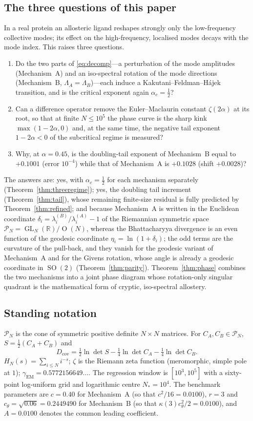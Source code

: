 \documentclass[11pt,reqno]{amsart}
\theoremstyle{plain}
\theoremstyle{definition}
\theoremstyle{remark}
\numberwithin{equation}{section}
\DeclareMathOperator{\GL}{GL}
\DeclareMathOperator{\Or}{O}
\DeclareMathOperator{\SO}{SO}
\newcommand{\Dcov}{D_{\mathrm{cov}}}
\newcommand{\Rr}{\mathbb{R}}
\newcommand{\CA}{C_A}
\newcommand{\CB}{C_B}
\newcommand{\PN}{\mathcal{P}_N}
\newcommand{\gEM}{\gamma_{\mathrm{EM}}}
\begin{document}
\subsection*{The three questions of this paper}
In a real protein an allosteric ligand reshapes strongly only the low-frequency collective modes; its effect on the high-frequency, localised modes decays with the mode index. This raises three questions.
\begin{enumerate}[label=(\arabic*),leftmargin=*]
\item Do the two parts of \eqref{eq:decomp}---a perturbation of the mode amplitudes (Mechanism~A) and an iso-spectral rotation of the mode directions (Mechanism~B, $\Lambda_A=\Lambda_B$)---each induce a Kakutani--Feldman--H\'ajek transition, and is the critical exponent again $\alpha_c=\tfrac12$?
\item Can a difference operator remove the Euler--Maclaurin constant $\zeta(2\alpha)$ at its root, so that at finite $N\le10^5$ the phase curve is the sharp kink $\max(1-2\alpha,0)$ and, at the same time, the negative tail exponent $1-2\alpha<0$ of the subcritical regime is measured?
\item Why, at $\alpha=0.45$, is the doubling-tail exponent of Mechanism~B equal to $+0.1001$ (error $10^{-4}$) while that of Mechanism~A is $+0.1028$ (shift $+0.0028$)?
\end{enumerate}
The answers are: yes, with $\alpha_c=\tfrac12$ for each mechanism separately (Theorem~\ref{thm:threeregime}); yes, the doubling tail increment (Theorem~\ref{thm:tail}), whose remaining finite-size residual is fully predicted by Theorem~\ref{thm:refined}; and because Mechanism~A is written in the Euclidean coordinate $\delta_i=\lambda^{(B)}_i/\lambda^{(A)}_i-1$ of the Riemannian symmetric space $\PN=\GL_N(\Rr)/\Or(N)$, whereas the Bhattacharyya divergence is an even function of the geodesic coordinate $\eta_i=\ln(1+\delta_i)$; the odd terms are the curvature of the pull-back, and they vanish for the geodesic variant of Mechanism~A and for the Givens rotation, whose angle is already a geodesic coordinate in $\SO(2)$ (Theorem~\ref{thm:parity}). Theorem~\ref{thm:phase} combines the two mechanisms into a joint phase diagram whose rotation-only singular quadrant is the mathematical form of cryptic, iso-spectral allostery.

\subsection*{Standing notation}
$\PN$ is the cone of symmetric positive definite $N\times N$ matrices. For $\CA,\CB\in\PN$, $S=\tfrac12(\CA+\CB)$ and
\[
\Dcov=\tfrac12\ln\det S-\tfrac14\ln\det\CA-\tfrac14\ln\det\CB .
\]
$H_N(s)=\sum_{i\le N}i^{-s}$; $\zeta$ is the Riemann zeta function (meromorphic, simple pole at $1$); $\gEM=0.5772156649\ldots$. The regression window is $[10^3,10^5]$ with a sixty-point log-uniform grid and logarithmic centre $N_*=10^4$. The benchmark parameters are $c=0.40$ for Mechanism~A (so that $c^2/16=0.0100$), $r=3$ and $c_\theta=\sqrt{0.06}=0.2449490$ for Mechanism~B (so that $\kappa(3)c_\theta^2/2=0.0100$), and $A=0.0100$ denotes the common leading coefficient.
\end{document}
